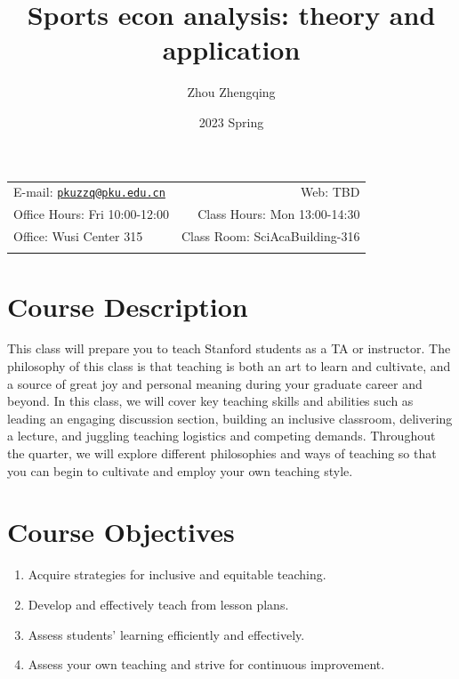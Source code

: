 \documentclass[11pt,]{article}
\title{Sports econ analysis: theory and application}
\author{Zhou Zhengqing}
\date{2023 Spring}
\begin{document}
		\maketitle
	

		\thispagestyle{firststyle}



	\noindent \begin{tabular*}{\textwidth}{ @{\extracolsep{\fill}} lr @{\extracolsep{\fill}}}


E-mail: \texttt{\href{mailto:pkuzzq@pku.edu.cn}{\nolinkurl{pkuzzq@pku.edu.cn}}} & Web: TBD\\
Office Hours: Fri 10:00-12:00  &  Class Hours: Mon 13:00-14:30\\
Office: Wusi Center 315  & Class Room: SciAcaBuilding-316\\
	&  \\
	\hline
	\end{tabular*}

\vspace{2mm}



\hypertarget{course-description}{%
\section{Course Description}\label{course-description}}

This class will prepare you to teach Stanford students as a TA or
instructor. The philosophy of this class is that teaching is both an art
to learn and cultivate, and a source of great joy and personal meaning
during your graduate career and beyond. In this class, we will cover key
teaching skills and abilities such as leading an engaging discussion
section, building an inclusive classroom, delivering a lecture, and
juggling teaching logistics and competing demands. Throughout the
quarter, we will explore different philosophies and ways of teaching so
that you can begin to cultivate and employ your own teaching style.

\hypertarget{course-objectives}{%
\section{Course Objectives}\label{course-objectives}}

\begin{enumerate}
\def\labelenumi{\arabic{enumi}.}
\item
  Acquire strategies for inclusive and equitable teaching.
\item
  Develop and effectively teach from lesson plans.
\item
  Assess students' learning efficiently and effectively.
\item
  Assess your own teaching and strive for continuous improvement.
\end{enumerate}
\end{document}

